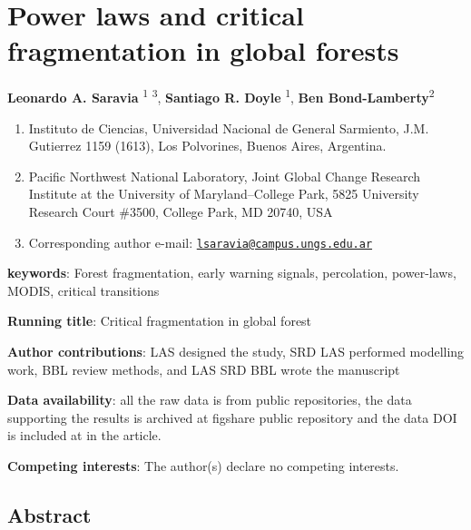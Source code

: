 \documentclass[]{article}
\date{}
\begin{document}
\section{Power laws and critical fragmentation in global
forests}\label{power-laws-and-critical-fragmentation-in-global-forests}

\textbf{Leonardo A. Saravia} \textsuperscript{1} \textsuperscript{3},
\textbf{Santiago R. Doyle} \textsuperscript{1}, \textbf{Ben
Bond-Lamberty}\textsuperscript{2}

\begin{enumerate}
\def\labelenumi{\arabic{enumi}.}
\item
  Instituto de Ciencias, Universidad Nacional de General Sarmiento, J.M.
  Gutierrez 1159 (1613), Los Polvorines, Buenos Aires, Argentina.
\item
  Pacific Northwest National Laboratory, Joint Global Change Research
  Institute at the University of Maryland--College Park, 5825 University
  Research Court \#3500, College Park, MD 20740, USA
\item
  Corresponding author e-mail:
  \href{mailto:lsaravia@campus.ungs.edu.ar}{\nolinkurl{lsaravia@campus.ungs.edu.ar}}
\end{enumerate}

\textbf{keywords}: Forest fragmentation, early warning signals,
percolation, power-laws, MODIS, critical transitions

\textbf{Running title}: Critical fragmentation in global forest

\textbf{Author contributions}: LAS designed the study, SRD LAS performed
modelling work, BBL review methods, and LAS SRD BBL wrote the manuscript

\textbf{Data availability}: all the raw data is from public
repositories, the data supporting the results is archived at figshare
public repository and the data DOI is included at in the article.

\textbf{Competing interests}: The author(s) declare no competing
interests.

\newpage

\subsection{Abstract}\label{abstract}
\end{document}
